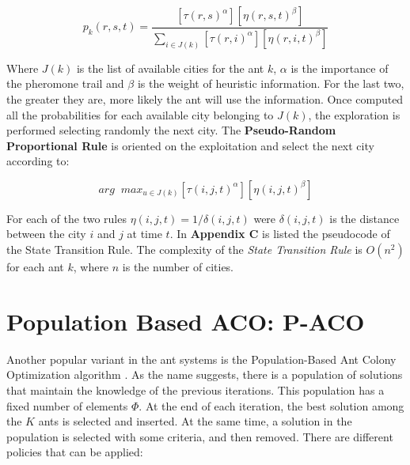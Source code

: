 \documentclass[a4paper,9pt,journal,twoside,compsoc]{PPIEEEtran}
\begin{document}
\begin{equation}
p_k(r, s, t) = \frac{[\tau(r, s)^{\alpha}][\eta(r, s, t)^{\beta} ]}{ \sum_{ i \in J(k) }[\tau(r, i)^{\alpha}][\eta(r, i, t)^{\beta} ]}
\end{equation}

Where $J(k)$ is the list of available cities for the ant $k$, $\alpha$ is the importance of the pheromone trail and $\beta$ is the weight of heuristic information. For the last two, the greater they are, more likely the ant will use the information. Once computed all the probabilities for each available city belonging to $J(k)$, the exploration is performed selecting randomly the next city. 
The \textbf{Pseudo-Random Proportional Rule} is oriented on the exploitation and select the next city according to:

\begin{equation}
arg \;\; max_{u \in J(k)} { [\tau(i, j, t)^{\alpha}][\eta(i, j, t)^{\beta} ] }
\end{equation}

For each of the two rules $\eta(i, j, t) = 1 / \delta(i, j, t)$ were $\delta(i, j, t)$ is the distance between the city $i$ and $j$ at time $t$.
In \textbf{Appendix C} is listed the pseudocode of the State Transition Rule. The complexity of the \textit{State Transition Rule} is $O(n^2)$ for each ant $k$, where $n$ is the number of cities.

\section{Population Based ACO: P-ACO}
Another popular variant in the ant systems is the Population-Based Ant Colony Optimization algorithm \cite{ant2}. As the name suggests, there is a population of solutions that maintain the knowledge of the previous iterations. This population has a fixed number of elements $\Phi$. At the end of each iteration, the best solution among the $K$ ants is selected and inserted. At the same time, a solution in the population is selected with some criteria, and then removed. There are different policies that can be applied:
\end{document}
